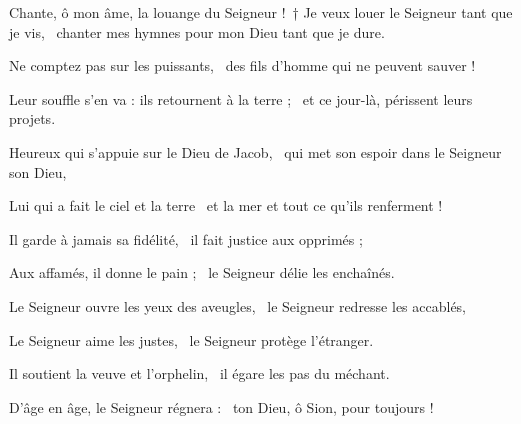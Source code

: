 \item Chante, ô mon âme, la louange du Seigneur !~† Je veux louer le Seigneur tant que je vis,~\psstar{} chanter mes hymnes pour mon Dieu tant que je dure.

\item Ne comptez pas sur les puissants,~\psstar{} des fils d'homme qui ne peuvent sauver !

\item Leur souffle s'en va : ils retournent à la terre ;~\psstar{} et ce jour-là, périssent leurs projets.

\item Heureux qui s'appuie sur le Dieu de Jacob,~\psstar{} qui met son espoir dans le Seigneur son Dieu,

\item Lui qui a fait le ciel et la terre~\psstar{} et la mer et tout ce qu'ils renferment ! 

\item Il garde à jamais sa fidélité,~\psstar{} il fait justice aux opprimés ; 

\item Aux affamés, il donne le pain ;~\psstar{} le Seigneur délie les enchaînés.

\item Le Seigneur ouvre les yeux des aveugles,~\psstar{} le Seigneur redresse les accablés, 

\item Le Seigneur aime les justes,~\psstar{} le Seigneur protège l'étranger. 

\item Il soutient la veuve et l'orphelin,~\psstar{} il égare les pas du méchant.

\item D'âge en âge, le Seigneur régnera :~\psstar{} ton Dieu, ô Sion, pour toujours !